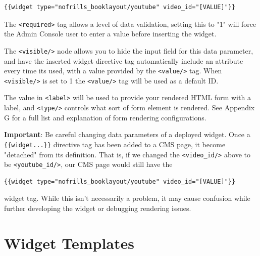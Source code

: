 \documentclass[oneside]{book}
\begin{document}
\begin{lstlisting}
{{widget type="nofrills_booklayout/youtube" video_id="[VALUE]"}}

\end{lstlisting}


The \footnotesize\texttt{\textless required\textgreater } \normalsize  tag allows a level of data validation, setting this to "1" will force the Admin Console user to enter a value before inserting the widget.  

The \footnotesize\texttt{\textless visible/\textgreater } \normalsize  node allows you to hide the input field for this data parameter, and have the inserted widget directive tag automatically include an attribute every time its used, with a value provided by the \footnotesize\texttt{\textless value/\textgreater } \normalsize  tag.  When \footnotesize\texttt{\textless visible/\textgreater } \normalsize  is set to 1 the \footnotesize\texttt{\textless value/\textgreater } \normalsize  tag will be used as a default ID.

The value in \footnotesize\texttt{\textless label\textgreater } \normalsize  will be used to provide your rendered HTML form with a label, and \footnotesize\texttt{\textless type/\textgreater } \normalsize  controls what sort of form element is rendered.  See Appendix G for a full list and explanation of form rendering configurations.

\textbf{Important}: Be careful changing data parameters of a deployed widget.  Once a \footnotesize\texttt{\{\{widget...\}\}} \normalsize  directive tag has been added to a CMS page, it become "detached" from its definition.  That is, if we changed the \footnotesize\texttt{\textless video\_id/\textgreater } \normalsize  above to be \footnotesize\texttt{\textless youtube\_id/\textgreater }\normalsize, our CMS page would still have the

\begin{lstlisting}
{{widget type="nofrills_booklayout/youtube" video_id="[VALUE]"}}

\end{lstlisting}


widget tag.  While this isn't necessarily a problem, it may cause confusion while further developing the widget or debugging rendering issues.

\section{Widget Templates}
\end{document}
